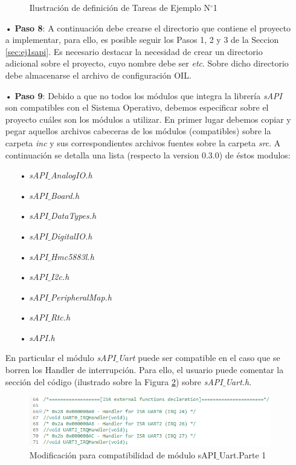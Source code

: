 \documentclass[12pt,letterpaper]{article}
\begin{document}
\begin{enumerate}
\begin{figure}[H]
\caption{Ilustración de definición de Tareas de Ejemplo N$^{\circ}$1}
\label{Fig39}
\end{figure}
\item[•]\textbf{Paso 8}: A continuación debe crearse el directorio que contiene el proyecto a implementar, para ello, es posible seguir los Pasos 1, 2 y 3 de la Seccion \ref{sec:ej1sapi}. Es necesario destacar la necesidad de crear un directorio adicional sobre el proyecto, cuyo nombre debe ser \textit{etc}. Sobre dicho directorio debe almacenarse el archivo de configuración OIL. 
\item[•]\textbf{Paso 9}: Debido a que no todos los módulos que integra la librería \textit{sAPI} son compatibles con el Sistema Operativo, debemos especificar sobre el proyecto cuáles son los módulos a utilizar. En primer lugar debemos copiar y pegar aquellos archivos cabeceras de los módulos (compatibles) sobre la carpeta \textit{inc} y sus correspondientes archivos fuentes sobre la carpeta \textit{src}. A continuación se detalla una lista (respecto la version 0.3.0) de éstos modulos:
\begin{enumerate}
\item[•]\textit{sAPI$\_$AnalogIO.h}
\item[•]\textit{sAPI$\_$Board.h}
\item[•]\textit{sAPI$\_$DataTypes.h}
\item[•]\textit{sAPI$\_$DigitalIO.h}
\item[•]\textit{sAPI$\_$Hmc5883l.h}
\item[•]\textit{sAPI$\_$I2c.h}
\item[•]\textit{sAPI$\_$PeripheralMap.h}
\item[•]\textit{sAPI$\_$Rtc.h}
\item[•]\textit{sAPI.h}
\end{enumerate}
En particular el módulo \textit{sAPI$\_$Uart} puede ser compatible en el caso que se borren los Handler de interrupción. Para ello, el usuario puede comentar la sección del código (ilustrado sobre la Figura \ref{modificacionuart}) sobre \textit{sAPI$\_$Uart.h}.
\begin{figure}[H]
\centering
\includegraphics[width=10 cm]{figuras/f29.png}
\caption{Modificación para compatibilidad de módulo sAPI$\_$Uart.Parte 1}
\label{modificacionuart}
\end{figure}


\end{enumerate}
\end{document}
